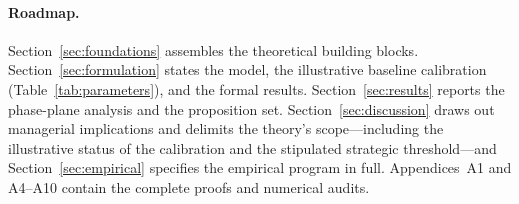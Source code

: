 \paragraph{Roadmap.}
Section~\ref{sec:foundations} assembles the theoretical building blocks.
Section~\ref{sec:formulation} states the model, the illustrative baseline
calibration (Table~\ref{tab:parameters}), and the formal results.
Section~\ref{sec:results} reports the phase-plane analysis and the
proposition set. Section~\ref{sec:discussion} draws out managerial
implications and delimits the theory's scope---including the illustrative
status of the calibration and the stipulated strategic threshold---and
Section~\ref{sec:empirical} specifies the empirical program in full.
Appendices~A1 and A4--A10 contain the complete proofs and numerical audits.
